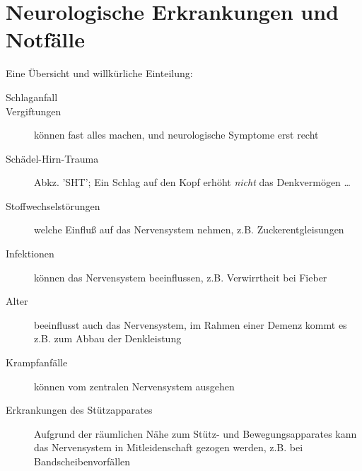 




\clearpage
\section{Neurologische Erkrankungen und Notfälle}


Eine Übersicht und willkürliche Einteilung:

\begin{description}
    \item [Schlaganfall]
    \item [Vergiftungen] können fast alles machen, und neurologische Symptome erst recht
    \item [Schädel-Hirn-Trauma] Abkz. 'SHT'; Ein Schlag auf
    den Kopf erhöht \emph{nicht} das Denkvermögen \ldots
    \item [Stoffwechselstörungen] welche Einfluß auf das Nervensystem nehmen, z.B. Zuckerentgleisungen 
    \item [Infektionen] können das Nervensystem beeinflussen, z.B. Verwirrtheit bei Fieber
    \item [Alter] beeinflusst auch das Nervensystem, im Rahmen einer Demenz kommt es z.B. zum Abbau der Denkleistung
    \item [Krampfanfälle] können vom zentralen Nervensystem ausgehen
    \item [Erkrankungen des Stützapparates] Aufgrund der räumlichen Nähe zum Stütz- und Bewegungsapparates kann das Nervensystem in Mitleidenschaft gezogen werden, z.B. bei Bandscheibenvorfällen
\end{description}


